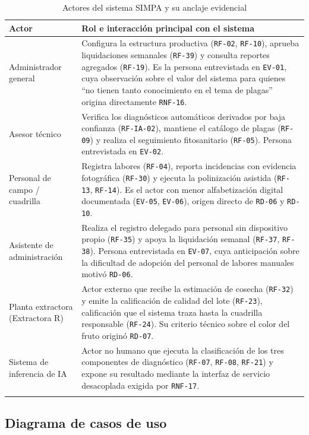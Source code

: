 \documentclass[11pt,a4paper]{article}
\newcommand{\id}[1]{\texttt{#1}}
\begin{document}
\begin{longtable}{|L{3.0cm}|L{9.6cm}|}
\hline
{}\textbf{Actor} & \textbf{Rol e interacción principal con el sistema} \\
\hline
\endhead
Administrador general & Configura la estructura productiva (\id{RF-02}, \id{RF-10}), aprueba
liquidaciones semanales (\id{RF-39}) y consulta reportes agregados (\id{RF-19}). Es la persona
entrevistada en \id{EV-01}, cuya observación sobre el valor del sistema para quienes ``no tienen
tanto conocimiento en el tema de plagas'' origina directamente \id{RNF-16}. \\ \hline
Asesor técnico & Verifica los diagnósticos automáticos derivados por baja confianza (\id{RF-IA-02}),
mantiene el catálogo de plagas (\id{RF-09}) y realiza el seguimiento fitosanitario (\id{RF-05}).
Persona entrevistada en \id{EV-02}. \\ \hline
Personal de campo / cuadrilla & Registra labores (\id{RF-04}), reporta incidencias con evidencia
fotográfica (\id{RF-30}) y ejecuta la polinización asistida (\id{RF-13}, \id{RF-14}). Es el actor
con menor alfabetización digital documentada (\id{EV-05}, \id{EV-06}), origen directo de
\id{RD-06} y \id{RD-10}. \\ \hline
Asistente de administración & Realiza el registro delegado para personal sin dispositivo propio
(\id{RF-35}) y apoya la liquidación semanal (\id{RF-37}, \id{RF-38}). Persona entrevistada en
\id{EV-07}, cuya anticipación sobre la dificultad de adopción del personal de labores manuales
motivó \id{RD-06}. \\ \hline
Planta extractora (Extractora R) & Actor externo que recibe la estimación de cosecha (\id{RF-32}) y
emite la calificación de calidad del lote (\id{RF-23}), calificación que el sistema traza hasta la
cuadrilla responsable (\id{RF-24}). Su criterio técnico sobre el color del fruto originó \id{RD-07}.
\\ \hline
Sistema de inferencia de IA & Actor no humano que ejecuta la clasificación de los tres componentes
de diagnóstico (\id{RF-07}, \id{RF-08}, \id{RF-21}) y expone su resultado mediante la interfaz de
servicio desacoplada exigida por \id{RNF-17}. \\ \hline
\caption{Actores del sistema SIMPA y su anclaje evidencial}
\label{tab:actores}
\end{longtable}

\subsection{Diagrama de casos de uso}
\end{document}
